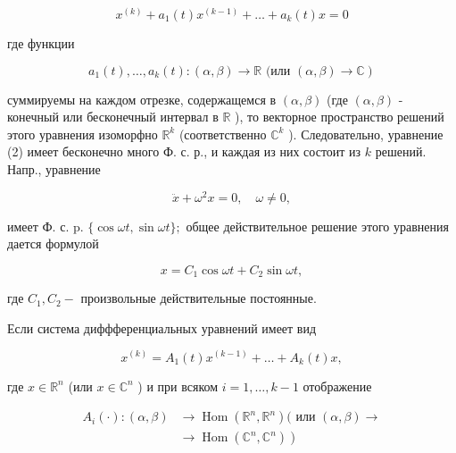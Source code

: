 \documentclass[10pt]{article}
\begin{document}
\[

x^{(k)}+a_{1}(t) x^{(k-1)}+\ldots+a_{k}(t) x=0

\]



где функции



\[

\left.a_{1}(t), \ldots, a_{k}(t):(\alpha, \beta) \rightarrow \mathbb{R} \text { (или }(\alpha, \beta) \rightarrow \mathbb{C}\right)

\]



суммируемы на каждом отрезке, содержащемся в $(\alpha, \beta)$ (где $(\alpha, \beta)$ - конечный или бесконечный интервал в $\mathbb{R}$ ), то векторное пространство решений этого уравнения изоморфно $\mathbb{R}^{k}$ (соответственно $\mathbb{C}^{k}$ ). Следовательно, уравнение (2) имеет бесконечно много Ф. с. р., и каждая из них состоит из $k$ решений. Напр., уравнение



\[

\ddot{x}+\omega^{2} x=0, \quad \omega \neq 0,

\]



имеет Ф. с. p. $\{\cos \omega t, \sin \omega t\} ;$ общее действительное решение этого уравнения дается формулой



\[

x=C_{1} \cos \omega t+C_{2} \sin \omega t,

\]



где $C_{1}, C_{2}-$ произвольные действительные постоянные.



Если система диффференциальных уравнений имеет вид



\[

x^{(k)}=A_{1}(t) x^{(k-1)}+\ldots+A_{k}(t) x,

\]



где $x \in \mathbb{R}^{n}$ (или $x \in \mathbb{C}^{n}$ ) и при всяком $i=1, \ldots, k-1$ отображение



\[

\begin{aligned}

A_{i}(\cdot):(\alpha, \beta) & \longrightarrow \operatorname{Hom}\left(\mathbb{R}^{n}, \mathbb{R}^{n}\right)(\text { или }(\alpha, \beta) \longrightarrow \\

& \left.\longrightarrow \operatorname{Hom}\left(\mathbb{C}^{n}, \mathbb{C}^{n}\right)\right)

\end{aligned}

\]
\end{document}
